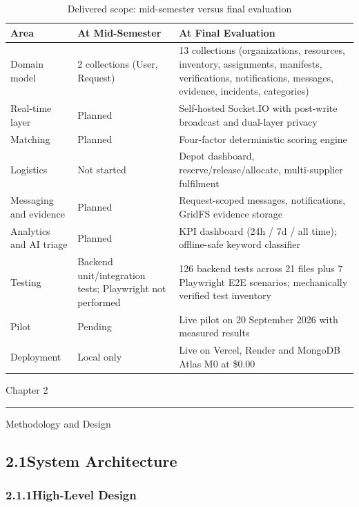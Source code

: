 \documentclass[11pt,a4paper]{article}
\newcommand{\chaptertitle}[2]{%
  \vspace*{0pt}%
  {\normalfont\fontsize{22}{25}\selectfont #1\par}%
  \vspace{2pt}%
  \noindent\rule{\textwidth}{0.7pt}\par
  \vspace{7pt}%
  {\normalfont\fontsize{22}{25}\selectfont #2\par}
  \vspace{5pt}%
}
\begin{document}
\renewcommand{\arraystretch}{1.25}
\begin{table}[H]
\centering
\begin{tabularx}{\textwidth}{@{}p{1.65in}p{1.7in}X@{}}
\toprule
\textbf{Area} & \textbf{At Mid-Semester} & \textbf{At Final Evaluation}\\
\midrule
Domain model & 2 collections (User, Request) & 13 collections (organizations, resources, inventory, assignments, manifests, verifications, notifications, messages, evidence, incidents, categories)\\
Real-time layer & Planned & Self-hosted Socket.IO with post-write broadcast and dual-layer privacy\\
Matching & Planned & Four-factor deterministic scoring engine\\
Logistics & Not started & Depot dashboard, reserve/release/allocate, multi-supplier fulfilment\\
Messaging and evidence & Planned & Request-scoped messages, notifications, GridFS evidence storage\\
Analytics and AI triage & Planned & KPI dashboard (24h / 7d / all time); offline-safe keyword classifier\\
Testing & Backend unit/integration tests; Playwright not performed & 126 backend tests across 21 files plus 7 Playwright E2E scenarios; mechanically verified test inventory\\
Pilot & Pending & Live pilot on 20 September 2026 with measured results\\
Deployment & Local only & Live on Vercel, Render and MongoDB Atlas M0 at \$0.00\\
\bottomrule
\end{tabularx}
\caption{Delivered scope: mid-semester versus final evaluation}\label{tab:delta}
\end{table}
\renewcommand{\arraystretch}{1}

\newpage

\label{ch2}
\chaptertitle{Chapter 2}{Methodology and Design}

\subsection{2.1\quad System Architecture}\label{s21}

\subsubsection{2.1.1\quad High-Level Design}\label{s211}
\end{document}
